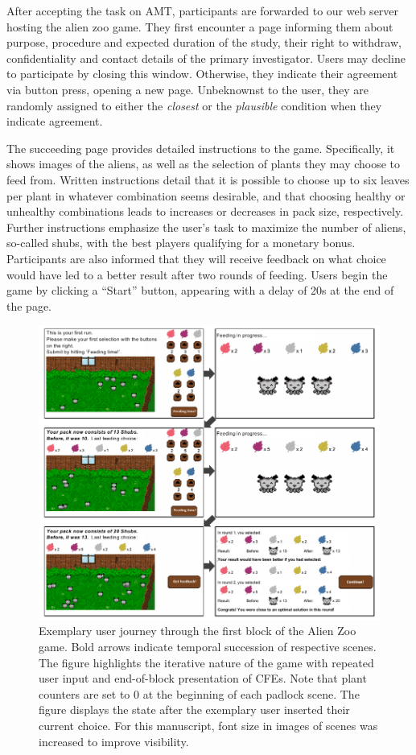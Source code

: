 After accepting the task on \gls{AMT}, participants are forwarded to our web server hosting the alien zoo game.
They first encounter a page informing them about purpose, procedure and expected duration of the study, their right to withdraw, confidentiality and contact details of the primary investigator.
Users may decline to participate by closing this window.
Otherwise, they indicate their agreement via button press, opening a new page.
Unbeknownst to the user, they are randomly assigned to either the \textit{closest} or the \textit{plausible} condition when they indicate agreement.

The succeeding page provides detailed instructions to the game. 
Specifically, it shows images of the aliens, as well as the selection of plants they may choose to feed from.
Written instructions detail that it is possible to choose up to six leaves per plant in whatever combination seems desirable, and that choosing healthy or unhealthy combinations leads to increases or decreases in pack size, respectively.
Further instructions emphasize the user's task to maximize the number of aliens, so-called shubs, with the best players qualifying for a monetary bonus.
Participants are also informed that they will receive feedback on what choice would have led to a better result after two rounds of feeding.
Users begin the game by clicking a ``Start'' button, appearing with a delay of 20s at the end of the page. 

\begin{figure}
   \centering
   \includegraphics[width=\textwidth]{./media/FigureGameInterface.pdf}
   \caption{Exemplary user journey through the first block of the Alien Zoo game. Bold arrows indicate temporal succession of respective scenes. The figure highlights the iterative nature of the game with repeated user input and end-of-block presentation of \glspl{CFE}. Note that plant counters are set to 0 at the beginning of each padlock scene. The figure displays the state after the exemplary user inserted their current choice. For this manuscript, font size in images of scenes was increased to improve visibility.}
   \label{fig:StudyStructure2}
 \end{figure}

